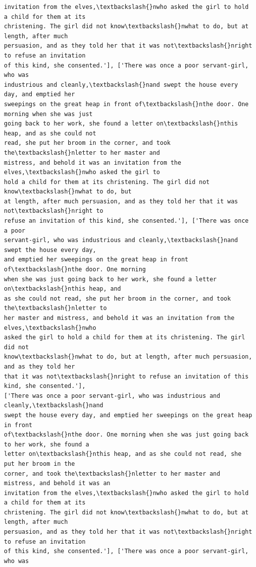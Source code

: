 \documentclass[11pt]{article}
\begin{document}
\begin{Verbatim}[commandchars=\\\{\}]
invitation from the elves,\textbackslash{}nwho asked the girl to hold a child for them at its
christening. The girl did not know\textbackslash{}nwhat to do, but at length, after much
persuasion, and as they told her that it was not\textbackslash{}nright to refuse an invitation
of this kind, she consented.'], ['There was once a poor servant-girl, who was
industrious and cleanly,\textbackslash{}nand swept the house every day, and emptied her
sweepings on the great heap in front of\textbackslash{}nthe door. One morning when she was just
going back to her work, she found a letter on\textbackslash{}nthis heap, and as she could not
read, she put her broom in the corner, and took the\textbackslash{}nletter to her master and
mistress, and behold it was an invitation from the elves,\textbackslash{}nwho asked the girl to
hold a child for them at its christening. The girl did not know\textbackslash{}nwhat to do, but
at length, after much persuasion, and as they told her that it was not\textbackslash{}nright to
refuse an invitation of this kind, she consented.'], ['There was once a poor
servant-girl, who was industrious and cleanly,\textbackslash{}nand swept the house every day,
and emptied her sweepings on the great heap in front of\textbackslash{}nthe door. One morning
when she was just going back to her work, she found a letter on\textbackslash{}nthis heap, and
as she could not read, she put her broom in the corner, and took the\textbackslash{}nletter to
her master and mistress, and behold it was an invitation from the elves,\textbackslash{}nwho
asked the girl to hold a child for them at its christening. The girl did not
know\textbackslash{}nwhat to do, but at length, after much persuasion, and as they told her
that it was not\textbackslash{}nright to refuse an invitation of this kind, she consented.'],
['There was once a poor servant-girl, who was industrious and cleanly,\textbackslash{}nand
swept the house every day, and emptied her sweepings on the great heap in front
of\textbackslash{}nthe door. One morning when she was just going back to her work, she found a
letter on\textbackslash{}nthis heap, and as she could not read, she put her broom in the
corner, and took the\textbackslash{}nletter to her master and mistress, and behold it was an
invitation from the elves,\textbackslash{}nwho asked the girl to hold a child for them at its
christening. The girl did not know\textbackslash{}nwhat to do, but at length, after much
persuasion, and as they told her that it was not\textbackslash{}nright to refuse an invitation
of this kind, she consented.'], ['There was once a poor servant-girl, who was

\end{Verbatim}
\end{document}
